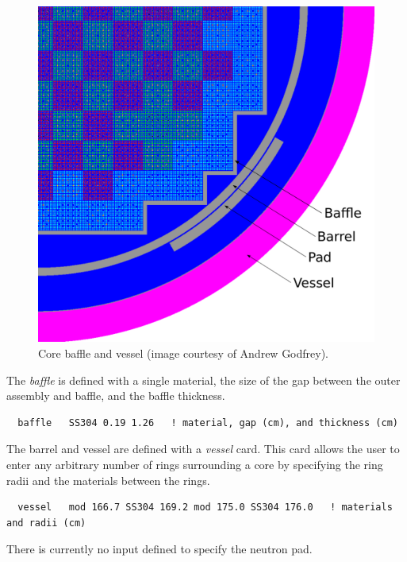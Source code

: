 \begin{figure}
\begin{center}
\includegraphics[width=5in]{figs/core_baffle.pdf}
\end{center}
\caption{\label{fig:corebaffle} Core baffle and vessel (image courtesy of Andrew Godfrey).}
\end{figure}


The {\it baffle} is defined with a single material, the size of the gap between the
outer assembly and baffle, and the baffle thickness.
\begin{verbatim}
  baffle   SS304 0.19 1.26   ! material, gap (cm), and thickness (cm)
\end{verbatim}

The barrel and vessel are defined with a {\it vessel} card.  This card allows the
user to enter any arbitrary number of rings surrounding a core by specifying the
ring radii and the materials between the rings.

\begin{verbatim}
  vessel   mod 166.7 SS304 169.2 mod 175.0 SS304 176.0   ! materials and radii (cm)
\end{verbatim}

There is currently no input defined to specify the neutron pad.

